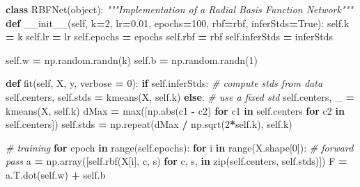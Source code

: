 \documentclass[
  a4paper,
,tablecaptionabove
]{scrartcl}
\newenvironment{Shaded}{\begin{snugshade}}{\end{snugshade}}
\newcommand{\BuiltInTok}[1]{#1}
\newcommand{\CommentTok}[1]{\textcolor[rgb]{0.56,0.35,0.01}{\textit{#1}}}
\newcommand{\ControlFlowTok}[1]{\textcolor[rgb]{0.13,0.29,0.53}{\textbf{#1}}}
\newcommand{\DecValTok}[1]{\textcolor[rgb]{0.00,0.00,0.81}{#1}}
\newcommand{\FloatTok}[1]{\textcolor[rgb]{0.00,0.00,0.81}{#1}}
\newcommand{\FunctionTok}[1]{\textcolor[rgb]{0.00,0.00,0.00}{#1}}
\newcommand{\KeywordTok}[1]{\textcolor[rgb]{0.13,0.29,0.53}{\textbf{#1}}}
\newcommand{\NormalTok}[1]{#1}
\newcommand{\OperatorTok}[1]{\textcolor[rgb]{0.81,0.36,0.00}{\textbf{#1}}}
\newcommand{\VariableTok}[1]{\textcolor[rgb]{0.00,0.00,0.00}{#1}}
\begin{document}
\begin{Shaded}
\begin{Highlighting}[]
\KeywordTok{class}\NormalTok{ RBFNet(}\BuiltInTok{object}\NormalTok{):}
    \CommentTok{"""Implementation of a Radial Basis Function Network"""}
    \KeywordTok{def} \FunctionTok{__init__}\NormalTok{(}\VariableTok{self}\NormalTok{, k}\OperatorTok{=}\DecValTok{2}\NormalTok{, lr}\OperatorTok{=}\FloatTok{0.01}\NormalTok{, epochs}\OperatorTok{=}\DecValTok{100}\NormalTok{, rbf}\OperatorTok{=}\NormalTok{rbf, inferStds}\OperatorTok{=}\VariableTok{True}\NormalTok{):}
        \VariableTok{self}\NormalTok{.k }\OperatorTok{=}\NormalTok{ k}
        \VariableTok{self}\NormalTok{.lr }\OperatorTok{=}\NormalTok{ lr}
        \VariableTok{self}\NormalTok{.epochs }\OperatorTok{=}\NormalTok{ epochs}
        \VariableTok{self}\NormalTok{.rbf }\OperatorTok{=}\NormalTok{ rbf}
        \VariableTok{self}\NormalTok{.inferStds }\OperatorTok{=}\NormalTok{ inferStds}

        \VariableTok{self}\NormalTok{.w }\OperatorTok{=}\NormalTok{ np.random.randn(k)}
        \VariableTok{self}\NormalTok{.b }\OperatorTok{=}\NormalTok{ np.random.randn(}\DecValTok{1}\NormalTok{)}

    \KeywordTok{def}\NormalTok{ fit(}\VariableTok{self}\NormalTok{, X, y, verbose }\OperatorTok{=} \DecValTok{0}\NormalTok{):}
        \ControlFlowTok{if} \VariableTok{self}\NormalTok{.inferStds:}
            \CommentTok{# compute stds from data}
            \VariableTok{self}\NormalTok{.centers, }\VariableTok{self}\NormalTok{.stds }\OperatorTok{=}\NormalTok{ kmeans(X, }\VariableTok{self}\NormalTok{.k)}
        \ControlFlowTok{else}\NormalTok{:}
            \CommentTok{# use a fixed std}
            \VariableTok{self}\NormalTok{.centers, _ }\OperatorTok{=}\NormalTok{ kmeans(X, }\VariableTok{self}\NormalTok{.k)}
\NormalTok{            dMax }\OperatorTok{=} \BuiltInTok{max}\NormalTok{([np.}\BuiltInTok{abs}\NormalTok{(c1 }\OperatorTok{-}\NormalTok{ c2)}
                        \ControlFlowTok{for}\NormalTok{ c1 }\KeywordTok{in} \VariableTok{self}\NormalTok{.centers}
                        \ControlFlowTok{for}\NormalTok{ c2 }\KeywordTok{in} \VariableTok{self}\NormalTok{.centers])}
            \VariableTok{self}\NormalTok{.stds }\OperatorTok{=}\NormalTok{ np.repeat(dMax }\OperatorTok{/}\NormalTok{ np.sqrt(}\DecValTok{2}\OperatorTok{*}\VariableTok{self}\NormalTok{.k), }\VariableTok{self}\NormalTok{.k)}

        \CommentTok{# training}
        \ControlFlowTok{for}\NormalTok{ epoch }\KeywordTok{in} \BuiltInTok{range}\NormalTok{(}\VariableTok{self}\NormalTok{.epochs):}
            \ControlFlowTok{for}\NormalTok{ i }\KeywordTok{in} \BuiltInTok{range}\NormalTok{(X.shape[}\DecValTok{0}\NormalTok{]):}
                \CommentTok{# forward pass}
\NormalTok{                a }\OperatorTok{=}\NormalTok{ np.array([}\VariableTok{self}\NormalTok{.rbf(X[i], c, s)}
                              \ControlFlowTok{for}\NormalTok{ c, s, }\KeywordTok{in} \BuiltInTok{zip}\NormalTok{(}\VariableTok{self}\NormalTok{.centers, }\VariableTok{self}\NormalTok{.stds)])}
\NormalTok{                F }\OperatorTok{=}\NormalTok{ a.T.dot(}\VariableTok{self}\NormalTok{.w) }\OperatorTok{+} \VariableTok{self}\NormalTok{.b}


\end{Highlighting}
\end{Shaded}
\end{document}
